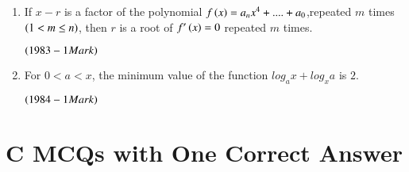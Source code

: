 \documentclass[journal,12pt,twocolumn]{IEEEtran}
\theoremstyle{remark}
\begin{document}
\begin{enumerate}

\item If $x-r$ is a factor of the polynomial
$f\left(x\right) = a_{n}x^{4}+....+a_{0}$,repeated $m$ times $\left(1< m\leq n\right)$, 
then $r$ is a root of $f'\left(x\right)=0$ repeated $m$ times.

\hfill$\left(1983 - 1 Mark\right)$

\item For $0 < a < x$, the minimum value of the function 
$log_a x + log_x a$ is $2$. 

\hfill$\left(1984 - 1 Mark\right)$\\

\end{enumerate}

\section{C MCQs with One Correct Answer}
\end{document}
